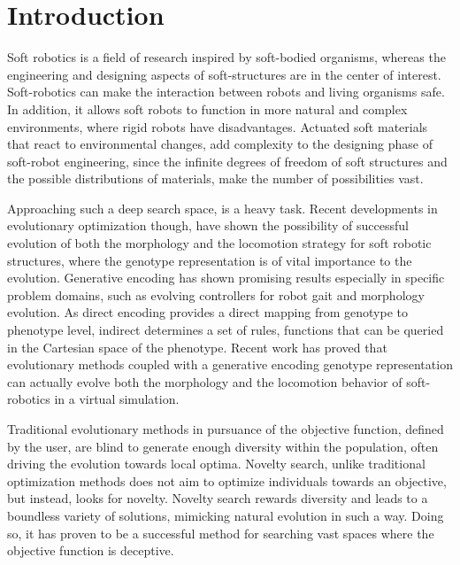 
\chapter{Introduction} %

\label{Chapter1} %


Soft robotics is a field of research inspired by soft-bodied organisms, whereas the engineering and designing aspects of soft-structures are in the center of interest. Soft-robotics can make the interaction between robots and living organisms safe. In addition, it allows soft robots to  function in more natural and  complex environments, where rigid robots have disadvantages. Actuated soft materials that react to environmental changes, add complexity to the designing phase of soft-robot engineering, since the infinite degrees of freedom of soft structures and the possible distributions of materials, make the number of possibilities vast.

Approaching such a deep search space, is a heavy task. Recent developments in evolutionary optimization though, have shown the possibility of successful evolution of both the morphology and the locomotion strategy for soft robotic structures, where the genotype representation is of vital importance to the evolution. Generative encoding has shown promising results especially in specific problem domains, such as evolving controllers for robot gait and morphology evolution. As direct encoding provides a direct mapping from genotype to phenotype level, indirect determines a set of rules, functions that can be queried in the Cartesian space of the phenotype. Recent work has proved that evolutionary methods coupled with a generative encoding genotype representation can actually evolve both the morphology and the locomotion behavior of soft-robotics in a virtual simulation.

Traditional evolutionary methods in pursuance of the objective function, defined by the user, are blind to generate enough diversity within the population, often driving the evolution towards local optima. Novelty search, unlike traditional optimization methods does not aim to optimize individuals towards an objective, but instead, looks for novelty. Novelty search rewards diversity and leads to a boundless variety of solutions, mimicking natural evolution in such a way. Doing so, it has proven to be a successful method for searching vast spaces where the objective function is deceptive.


